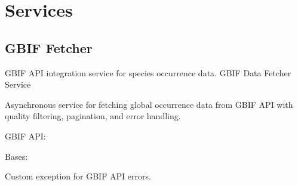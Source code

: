 \documentclass[letterpaper,10pt,english]{sphinxmanual}
\begin{document}
\section{Services}
\label{\detokenize{api_reference:services}}

\subsection{GBIF Fetcher}
\label{\detokenize{api_reference:gbif-fetcher}}
\sphinxAtStartPar
GBIF API integration service for species occurrence data.
\label{\detokenize{api_reference:module-app.services.gbif_fetcher}}
\sphinxAtStartPar
GBIF Data Fetcher Service

\sphinxAtStartPar
Asynchronous service for fetching global occurrence data from GBIF API with
quality filtering, pagination, and error handling.

\sphinxAtStartPar
GBIF API: 

\begin{fulllineitems}
\label{\detokenize{api_reference:app.services.gbif_fetcher.GBIFError}}
\pysigstartsignatures
\pysigline
{}
\pysigstopsignatures
\sphinxAtStartPar
Bases: 

\sphinxAtStartPar
Custom exception for GBIF API errors.

\end{fulllineitems}

\end{document}
